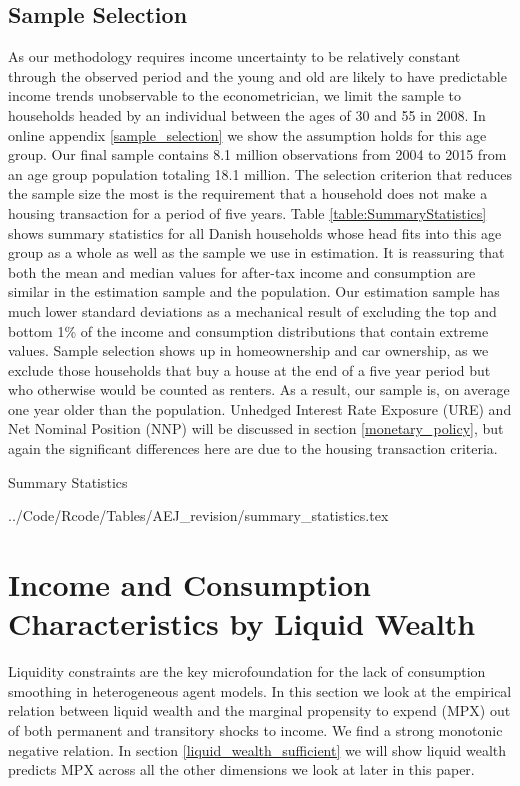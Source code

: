 \documentclass[titlepage]{\econtex}\newcommand{\texname}{ConsumptionHeterogeneity}
\newcommand{\tabdir}{../Code/Rcode/Tables/AEJ_revision}
\begin{document}
	\subsection{Sample Selection}
	As our methodology requires income uncertainty to be relatively constant through the observed period and the young and old are likely to have predictable income trends unobservable to the econometrician, we limit the sample to households headed by an individual between the ages of 30 and 55 in 2008. In online appendix \ref{sample_selection} we show the assumption holds for this age group. Our final sample contains 8.1 million observations from 2004 to 2015 from an age group population totaling 18.1 million. The selection criterion that reduces the sample size the most is the requirement that a household does not make a housing transaction for a period of five years. Table \ref{table:SummaryStatistics} shows summary statistics for all Danish households whose head fits into this age group as a whole as well as the sample we use in estimation. It is reassuring that both the mean and median values for after-tax income and consumption are similar in the estimation sample and the population. Our estimation sample has much lower standard deviations as a mechanical result of excluding the top and bottom 1\% of the income and consumption distributions that contain extreme values. Sample selection shows up in homeownership and car ownership, as we exclude those households that buy a house at the end of a five year period but who otherwise would be counted as renters. As a result, our sample is, on average one year older than the population. Unhedged Interest Rate Exposure (URE) and Net Nominal Position (NNP) will be discussed in section \ref{monetary_policy}, but again the significant differences here are due to the housing transaction criteria. 
	\begin{center} 
		\begin{table}
			\caption{Summary Statistics}
			\label{table:SummaryStatistics}
			\tabdir/summary_statistics.tex 
		\end{table}
	\end{center}
	
	\section{Income and Consumption Characteristics by Liquid Wealth} \label{MPX_wealth}
	Liquidity constraints are the key microfoundation for the lack of consumption smoothing in heterogeneous agent models. In this section we look at the empirical relation between liquid wealth and the marginal propensity to expend (MPX) out of both permanent and transitory shocks to income. We find a strong monotonic negative relation. In section \ref{liquid_wealth_sufficient} we will show liquid wealth predicts MPX across all the other dimensions we look at later in this paper.
	
\end{document}
